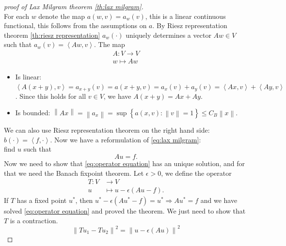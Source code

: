 \documentclass[../Main/main.tex]{subfiles}
\begin{document}
	\begin{proof}[proof of Lax Milgram theorem \ref{th:lax milgram}]
		$ $\\
		For each $w$ denote the map $a(w,v) = a_w(v)$, this is a linear continuous functional, this follows from the assumptions on $a$. By Riesz representation theorem \ref{th:riesz representation} $a_w(\cdot)$ uniquely determines a vector $Aw \in V$ such that $a_w(v) = \left \langle Aw,v \right \rangle$. The map
		\begin{equation*}
			\begin{gathered}
				A:V\rightarrow V \\
				w \mapsto Aw
			\end{gathered}
		\end{equation*}
		\begin{itemize}
			\item 		Is linear: $\left \langle A(x+y),v  \right \rangle = a_{x+y}(v) = a(x+y,v) = a_x(v)+a_y(v) = \left \langle Ax,v \right \rangle+\left \langle Ay,v \right \rangle$. Since this holds for all $v \in V$, we have $A(x+y)=Ax + Ay$.
			\item Is bounded: $\left \| Ax \right \|=\left \| a_x \right \| = \sup \left \{ a(x,v):\left \| v \right \|=1 \right \} \leq C_B \left \| x \right \|$.
		\end{itemize}
		We can also use Riesz representation theorem on the right hand side: $b(\cdot)=\left \langle f,\cdot \right \rangle$. Now we have a reformulation of \eqref{eq:lax milgram}:\\
		find $u$ such that
		\begin{equation}\label{eq:operator equation}
			Au = f.
		\end{equation}
		Now we need to show that \eqref{eq:operator equation} has an unique solution, and for that we need the Banach fixpoint theorem. Let $\epsilon > 0$, we define the operator 
		\begin{equation*}
			\begin{aligned}
				T:V &\rightarrow V \\
				u &\mapsto u-\epsilon (Au-f).
			\end{aligned}
		\end{equation*}
		If $T$ has a fixed point $u^*$, then $u^*-\epsilon(Au^*-f)=u^* \Rightarrow Au^* =f$ and we have solved \eqref{eq:operator equation} and proved the theorem. We just need to show that $T$ is a contraction.
		\begin{equation*}
			\left \| Tu_1 - Tu_2 \right \|^2 = \left \| u-\epsilon(Au) \right \|^2 

\end{equation*}
\end{proof}
\end{document}
